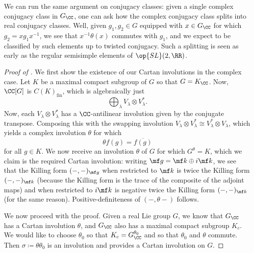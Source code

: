 \documentclass[../notes.tex]{subfiles}
\begin{document}
\begin{example}
	We can run the same argument on conjugacy classes: given a single complex conjugacy class in $G_\CC$, one can ask how the complex conjugacy class splits into real conjugacy classes. Well, given $g_1,g_2\in G$ equipped with $x\in G_\CC$ for which $g_2=xg_1x^{-1}$, we see that $x^{-1}\theta(x)$ commutes with $g_1$, and we expect to be classified by such elements up to twisted conjugacy. Such a splitting is seen as early as the regular semisimple elements of $\op{SL}(2,\RR)$.
\end{example}
\begin{proof}[Proof of ]
	We first show the existence of our Cartan involutions in the complex case. Let $K$ be a maximal compact subgroup of $G$ so that $G=K_\CC$. Now, $\CC[G]$ is $C(K)_{\mathrm{fin}}$, which is algebraically just
	\[\bigoplus_\lambda V_\lambda\otimes V_\lambda^*.\]
	Now, each $V_\lambda\otimes V_\lambda^*$ has a $\CC$-antilinear involution given by the conjugate transpose. Composing this with the swapping involution $V_\lambda\otimes V_\lambda^*\cong V_\lambda^*\otimes V_\lambda$, which yields a complex involution $\theta$ for which
	\[\theta f(g)=\overline{f(g)}\]
	for all $g\in K$. We now receive an involution $\theta$ of $G$ for which $G^\theta=K$, which we claim is the required Cartan involution: writing $\mf g=\mf k\oplus i\mf k$, we see that the Killing form $(-,-)_{\mf g}$ when restricted to $\mf k$ is twice the Killing form $(-,-)_{\mf k}$ (because the Killing form is the trace of the composite of the adjoint maps) and when restricted to $i\mf k$ is negative twice the Killing form $(-,-)_{\mf k}$ (for the same reason). Positive-definiteness of $(-,\theta-)$ follows.

	We now proceed with the proof. Given a real Lie group $G$, we know that $G_\CC$ has a Cartan involution $\theta$, and $G_\CC$ also has a maximal compact subgroup $K_c$. We would like to choose $\theta_0$ so that $K_c=G_\CC^{\theta_0}$ and so that $\theta_0$ and $\theta$ commute. Then $\sigma\coloneqq\theta\theta_0$ is an involution and provides a Cartan involution on $G$.


\end{proof}
\end{document}
